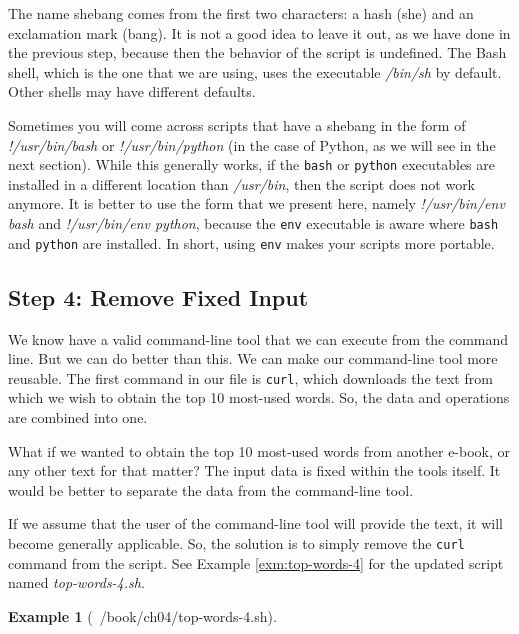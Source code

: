 \documentclass[
]{book}
\theoremstyle{definition}
\theoremstyle{definition}
\newtheorem{example}{Example}[chapter]
\theoremstyle{definition}
\theoremstyle{remark}
\begin{document}
The name shebang comes from the first two characters: a hash (she) and an exclamation mark (bang). It is not a good idea to leave it out, as we have done in the previous step, because then the behavior of the script is undefined. The Bash shell, which is the one that we are using, uses the executable \emph{/bin/sh} by default. Other shells may have different defaults.

Sometimes you will come across scripts that have a shebang in the form of \emph{!/usr/bin/bash} or \emph{!/usr/bin/python} (in the case of Python, as we will see in the next section). While this generally works, if the \texttt{bash} or \texttt{python} \citep{python} executables are installed in a different location than \emph{/usr/bin}, then the script does not work anymore. It is better to use the form that we present here, namely \emph{!/usr/bin/env bash} and \emph{!/usr/bin/env python}, because the \texttt{env} \citep{env} executable is aware where \texttt{bash} and \texttt{python} are installed. In short, using \texttt{env} makes your scripts more portable.

\hypertarget{step-4-remove-fixed-input}{%
\subsection{Step 4: Remove Fixed Input}\label{step-4-remove-fixed-input}}

We know have a valid command-line tool that we can execute from the command line. But we can do better than this. We can make our command-line tool more reusable. The first command in our file is \texttt{curl}, which downloads the text from which we wish to obtain the top 10 most-used words. So, the data and operations are combined into one.

What if we wanted to obtain the top 10 most-used words from another e-book, or any other text for that matter? The input data is fixed within the tools itself. It would be better to separate the data from the command-line tool.

If we assume that the user of the command-line tool will provide the text, it will become generally applicable. So, the solution is to simply remove the \texttt{curl} command from the script. See Example \ref{exm:top-words-4} for the updated script named \emph{top-words-4.sh}.

\begin{example}[~/book/ch04/top-words-4.sh]
\protect\hypertarget{exm:top-words-4}{}{\label{exm:top-words-4} {} }
\end{example}
\end{document}
